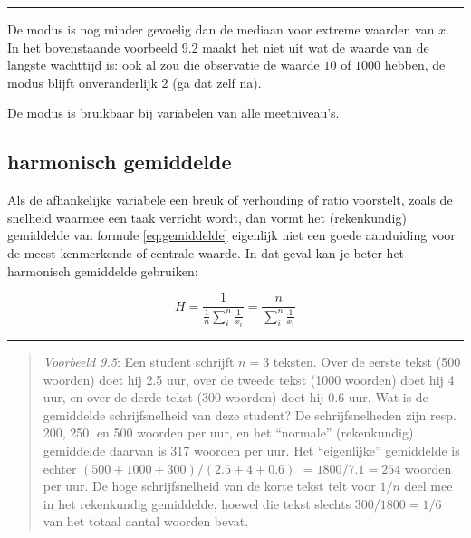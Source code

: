 \documentclass[
]{book}
\begin{document}
\begin{center}\rule{0.5\linewidth}{0.5pt}\end{center}

De modus is nog minder gevoelig dan de mediaan voor extreme waarden van
\(x\). In het bovenstaande voorbeeld 9.2 maakt het niet uit wat de waarde
van de langste wachttijd is: ook al zou die observatie de waarde \(10\) of
\(1000\) hebben, de modus blijft onveranderlijk \(2\) (ga dat zelf na).

De modus is bruikbaar bij variabelen van alle meetniveau's.

\hypertarget{sec:harmonischgemiddelde}{%
\subsection{harmonisch gemiddelde}\label{sec:harmonischgemiddelde}}

Als de afhankelijke variabele een breuk of verhouding of ratio
voorstelt, zoals de snelheid waarmee een taak verricht wordt, dan vormt
het (rekenkundig) gemiddelde van formule \eqref{eq:gemiddelde}
eigenlijk niet een goede aanduiding voor de
meest kenmerkende of centrale waarde. In dat geval kan je beter het
harmonisch gemiddelde gebruiken:

\begin{equation}
  H = \frac{1}{\frac{1}{n} \sum\limits_{i}^n \frac{1}{x_i} } = \frac{n}{\sum\limits_{i}^n \frac{1}{x_i}}
  \label{eq:harmonischgemiddelde}
\end{equation}

\begin{center}\rule{0.5\linewidth}{0.5pt}\end{center}

\begin{quote}
\emph{Voorbeeld 9.5}:
Een student schrijft \(n=3\) teksten. Over de eerste tekst (500 woorden)
doet hij 2.5 uur, over de tweede tekst (1000 woorden) doet hij 4 uur, en
over de derde tekst (300 woorden) doet hij 0.6 uur. Wat is de gemiddelde
schrijfsnelheid van deze student? De schrijfsnelheden zijn resp. 200,
250, en 500 woorden per uur, en het ``normale'' (rekenkundig) gemiddelde
daarvan is 317 woorden per uur. Het ``eigenlijke'' gemiddelde is
echter \((500+1000+300)/(2.5+4+0.6)\) \(=1800/7.1=254\) woorden per uur. De hoge
schrijfsnelheid van de korte tekst telt voor \(1/n\) deel mee in het
rekenkundig gemiddelde, hoewel die tekst slechts \(300/1800=1/6\) van het
totaal aantal woorden bevat.
\end{quote}
\end{document}
